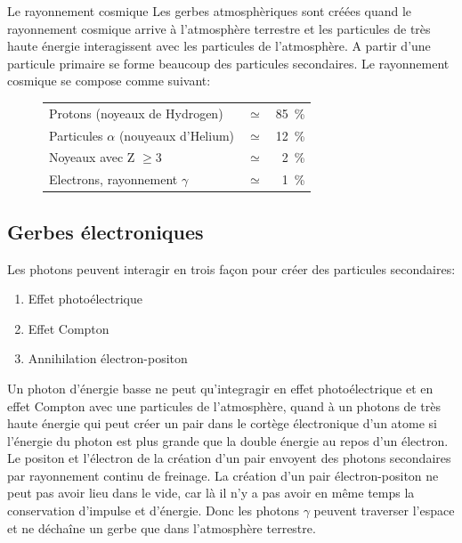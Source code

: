 \documentclass[a4paper,11pt,liststotocnumbered,bibtotocnumbered]{scrartcl}
\begin{document}
 \begin{section}{Le rayonnement cosmique}
  Les gerbes atmosphèriques sont créées quand le rayonnement cosmique arrive à l'atmosphère terrestre et les particules de très haute énergie interagissent avec les particules de l'atmosphère. A partir d'une particule primaire se forme beaucoup des particules secondaires. Le rayonnement cosmique se compose comme suivant:
   \begin{figure}[htb]
    \centering
    \begin{tabular}{lcr}
     Protons (noyeaux de Hydrogen) & $\simeq$ & 85~\%\\
     Particules $\alpha$ (nouyeaux d'Helium) & $\simeq$ & 12~\%\\
     Noyeaux avec Z $\geq 3$	& $\simeq$ & 2~\%\\ 
     Electrons, rayonnement $\gamma$	& $\simeq$ & 1~\%\\
    \end{tabular}\cite[S. 14]{burak}
   \end{figure}	

   \subsection{Gerbes électroniques}
    Les photons peuvent interagir en trois fa\c con pour créer des particules secondaires:
    \begin{enumerate}
     \item{Effet photoélectrique}
     \item{Effet Compton}
     \item{Annihilation électron-positon}
    \end{enumerate}
    Un photon d'énergie basse ne peut qu'integragir en effet photoélectrique et en effet Compton avec une particules de l'atmosphère, quand à un photons de très haute énergie qui peut créer un pair dans le cortège électronique d'un atome si l'énergie du photon est plus grande que la double énergie au repos d'un électron. Le positon et l'électron de la création d'un pair envoyent des photons secondaires par rayonnement continu de freinage.
    La création d'un pair électron-positon ne peut pas avoir lieu dans le vide, car là il n'y a pas avoir en même temps la conservation d'impulse et d'énergie. Donc les photons $\gamma$ peuvent traverser l'espace et ne déchaîne un gerbe que dans l'atmosphère terrestre.


\end{section}
\end{document}
